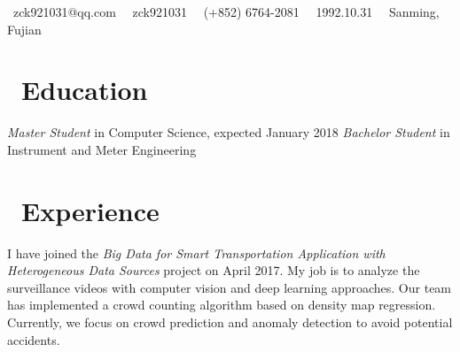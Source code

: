 \documentclass{resume}
\begin{document}
\centerline{\sffamily\large{\faEnvelope\ {zck921031@qq.com} \ \faWeixin\ zck921031 \ \faPhone\ {(+852) 6764-2081} \ \faBirthdayCake\ {1992.10.31} \ \faHome\ {Sanming, Fujian}} \vspace{1.0ex}}
\section{\faGraduationCap\  Education}
\textit{Master Student} in Computer Science, expected January 2018
\textit{Bachelor Student} in Instrument and Meter Engineering
\section{\faUsers\ Experience}
I have joined the \textsl{Big Data for Smart Transportation Application with Heterogeneous Data Sources} project on April 2017.
My job is to analyze the surveillance videos with computer vision and deep learning approaches.
Our team has implemented a crowd counting algorithm based on density map regression.
Currently, we focus on crowd prediction and anomaly detection to avoid potential accidents.
\end{document}
